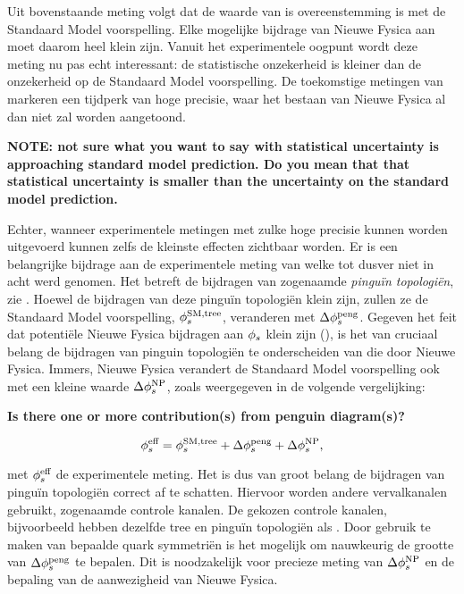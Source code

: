 \noindent Uit bovenstaande meting volgt dat de waarde van \phis is overeenstemming is met de Standaard Model voorspelling. Elke mogelijke bijdrage van Nieuwe Fysica aan \phis moet daarom heel klein zijn. Vanuit het experimentele oogpunt wordt deze meting nu pas echt interessant: de statistische onzekerheid is kleiner dan de onzekerheid op de Standaard Model voorspelling. De toekomstige metingen van \phis markeren een tijdperk van hoge precisie, waar het bestaan van Nieuwe Fysica al dan niet zal worden aangetoond.

\textbf{NOTE: not sure what you want to say with statistical uncertainty is approaching standard model prediction. Do you mean that that statistical uncertainty is smaller than the uncertainty on the standard model prediction.}

Echter, wanneer experimentele metingen met zulke hoge precisie kunnen worden uitgevoerd
kunnen zelfs de kleinste effecten zichtbaar worden. Er is een belangrijke bijdrage aan de
experimentele meting van \phis welke tot dusver niet in acht werd genomen. Het betreft de
bijdragen van zogenaamde {\it pingu\"in topologi\"en}, zie  .
Hoewel de bijdragen van deze pingu\"in topologi\"en klein zijn, zullen ze de Standaard Model
voorspelling, $\phi_{s}^{\tiny \text{SM,tree}}$, veranderen met $\Delta\phi_{s}^{\tiny\text{peng}}$. Gegeven het
feit dat potenti\"ele Nieuwe Fysica bijdragen aan $\phi_{s}$ klein zijn (),
is het van cruciaal belang de bijdragen van pinguin topologi\"en te onderscheiden van die door Nieuwe Fysica.
Immers, Nieuwe Fysica verandert de Standaard Model voorspelling ook met een kleine waarde
 $\Delta\phi_{s}^{\tiny \text{NP}}$, zoals weergegeven in de volgende vergelijking:

\textbf{Is there one or more contribution(s) from penguin diagram(s)?}

\begin{equation}
\centering
 \phis^{\text {eff}} = \phis^{\tiny \text{SM,tree}} + \Delta\phiS{peng} + \Delta\phis^{\tiny \text{NP}},
 \label{app_phis_sm_peng}
\end{equation}


\noindent met $\phi_{s}^{\text {eff}}$ de experimentele \phis meting. Het is dus van groot belang de
bijdragen van pingu\"in topologi\"en correct af te schatten. Hiervoor worden andere \Bs vervalkanalen gebruikt,
 zogenaamde controle kanalen. De gekozen controle kanalen, bijvoorbeeld \BsJpsiKst hebben dezelfde tree en
  pingu\"in topologi\"en als \BsJpsiPhi. Door gebruik te maken van bepaalde quark symmetri\"en is het
  mogelijk om nauwkeurig de grootte van $\Delta\phi_{s}^{\tiny\text{peng}}$ te bepalen. Dit is noodzakelijk voor precieze
  meting van $\Delta\phi_{s}^{\tiny \text{NP}}$ en de bepaling van de aanwezigheid van Nieuwe Fysica.

